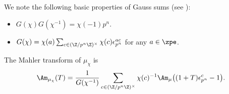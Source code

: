 \documentclass[a4paper,10pt, english, reqno]{smfart}
\numberwithin{equation}{section}
\begin{document}
\begin{remark} \label{RemPropertiesGaussSum}
 We note the following basic properties of Gauss sums (see \cite[\S4.3]{DS05}):
 \begin{itemize}
  \item[(i)] $G(\chi) G(\chi^{-1}) = \chi(-1) p^n.$
  \item[(ii)] $G(\chi) = \chi(a) \sum_{c \in (\Z / p^n \Z)^\times} \chi(c) \epsilon_{p^n}^{ac}$ for any $a \in \zpe$. %
 \end{itemize}
\end{remark}






\begin{lemma}\label{lem:mahler chi}
The Mahler transform of $\mu_{\chi}$ is
\[\Am_{\mu_\chi}(T) = \frac{1}{G(\chi^{-1})}\sum_{c \in (\Z/p^n \Z)^\times} \chi(c)^{-1}\Am_{\mu} \big( (1+T)\epsilon_{p^n}^c - 1 \big).\]
\end{lemma}
\end{document}
